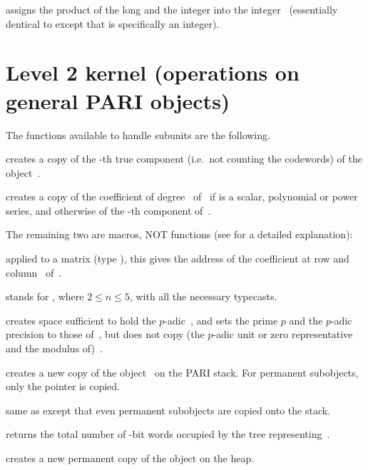  assigns the product of the long
 and the integer  into the integer~ (essentially
dentical to  except that  is specifically an integer).

\section{Level 2 kernel (operations on general PARI objects)}

\noindent The functions available to handle subunits are the following.

 creates a copy of the -th true
component (i.e.\ not counting the codewords) of the object~.

 creates a copy of the coefficient of
degree~ of~ if  is a scalar, polynomial or power series,
and otherwise of the -th component of~.

\noindent %
The remaining two are macros, NOT functions (see  for a
detailed explanation):

 applied to a matrix  (type
), this gives the address of the coefficient at row  and
column~ of~.

 stands for
, where $2\le n \le 5$, with all the
necessary typecasts.


 creates space sufficient to hold the $p$-adic~,
and sets the prime $p$ and the $p$-adic precision to those of~, but
does not copy (the $p$-adic unit or zero representative and the modulus
of)~.

 creates a new copy of the object~ on the PARI
stack. For permanent subobjects, only the pointer is copied.

 same as  except that even permanent
subobjects are copied onto the stack.

 returns the total number of \B-bit words occupied
by the tree representing~.

 creates a new permanent copy of the object 
on the heap.

